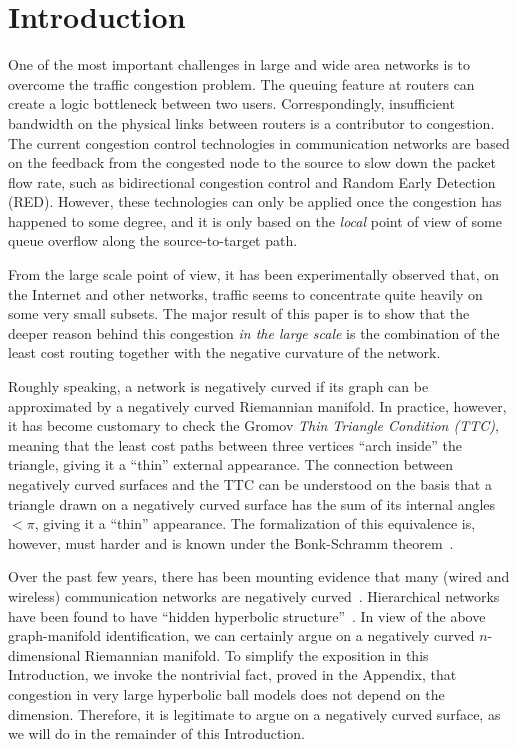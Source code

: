 \documentclass{article}
\begin{document}
\noindent 
\section{Introduction}

One of the most important challenges in large and wide area networks is to overcome the traffic congestion problem. The queuing feature at routers can create a logic bottleneck between two users. Correspondingly, insufficient bandwidth on the physical links between routers is a contributor to congestion. The current congestion control technologies in communication networks are based on the feedback from the congested node to the source to slow down the packet flow rate, such as bidirectional congestion control and Random Early Detection (RED). However, these technologies can only be applied once the congestion has happened to some degree, and it is only based on the \textit{local} point of view of some queue overflow along the source-to-target path. 

From the large scale point of view, it has been experimentally observed that, on the Internet and other networks, traffic seems to concentrate quite heavily on some very small subsets. The major result of this paper is to show that the deeper reason behind this congestion \textit{in the large scale} is the combination of the least cost routing together with the negative curvature of the network. 

Roughly speaking, a network is negatively curved if its graph can be approximated by a negatively curved Riemannian manifold. In practice, however, it has become customary to check the Gromov   \textit{Thin Triangle Condition (TTC)}, meaning that the least cost paths between three vertices ``arch inside'' the triangle, giving it a ``thin'' external appearance. The connection between negatively curved surfaces and the TTC can be understood on the basis that a triangle drawn on a negatively curved surface has the sum of its internal angles $<\pi $, giving it a ``thin'' appearance. The formalization of this equivalence is, however, must harder and is known under the Bonk-Schramm theorem~\cite{bonk_schramm}. 

Over the past few years, there has been mounting evidence that many (wired and wireless) communication networks are negatively curved~\cite{Matt_thesis,scaled_gromov,JonckheereLohsoonthornACC2004,JonckheereLohsoonthornMED2002}. Hierarchical networks have been found to have ``hidden hyperbolic structure''~\cite{dima_hidden_hyperbolic}. In view of the above graph-manifold identification, we can certainly argue on a negatively curved $n$-dimensional Riemannian manifold. To simplify the exposition in this Introduction, we invoke the nontrivial fact, proved in the Appendix, that congestion in very large hyperbolic ball models does not depend on the dimension. Therefore, it is legitimate to argue on a negatively curved surface, as we will do in the remainder of this Introduction.  
\end{document}

